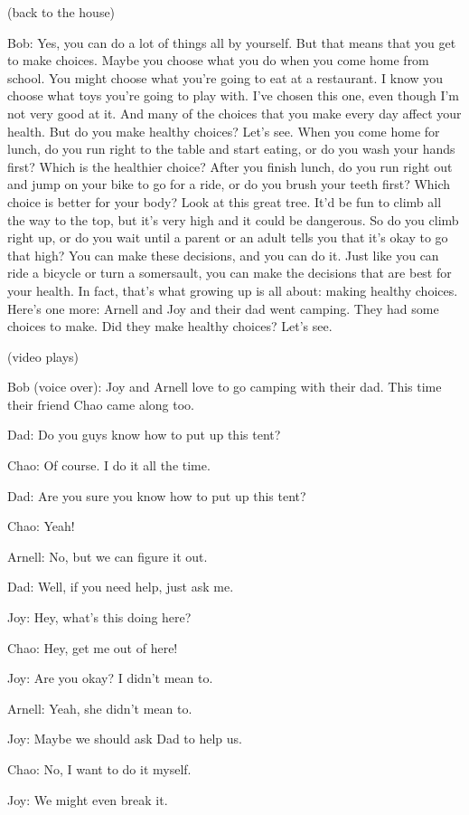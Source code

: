 (back to the house)

Bob: Yes, you can do a lot of things all by yourself. But that means that you get to make choices. Maybe you choose what you do when you come home from school. You might choose what you're going to eat at a restaurant. I know you choose what toys you're going to play with. I've chosen this one, even though I'm not very good at it. And many of the choices that you make every day affect your health. But do you make healthy choices? Let's see. When you come home for lunch, do you run right to the table and start eating, or do you wash your hands first? Which is the healthier choice? After you finish lunch, do you run right out and jump on your bike to go for a ride, or do you brush your teeth first? Which choice is better for your body? Look at this great tree. It'd be fun to climb all the way to the top, but it's very high and it could be dangerous. So do you climb right up, or do you wait until a parent or an adult tells you that it's okay to go that high? You can make these decisions, and you can do it. Just like you can ride a bicycle or turn a somersault, you can make the decisions that are best for your health. In fact, that's what growing up is all about: making healthy choices. Here's one more: Arnell and Joy and their dad went camping. They had some choices to make. Did they make healthy choices? Let's see.

(video plays)

Bob (voice over): Joy and Arnell love to go camping with their dad. This time their friend Chao came along too.

Dad: Do you guys know how to put up this tent?

Chao: Of course. I do it all the time.

Dad: Are you sure you know how to put up this tent?

Chao: Yeah!

Arnell: No, but we can figure it out.

Dad: Well, if you need help, just ask me.

Joy: Hey, what's this doing here?

Chao: Hey, get me out of here!

Joy: Are you okay? I didn't mean to.

Arnell: Yeah, she didn't mean to.

Joy: Maybe we should ask Dad to help us.

Chao: No, I want to do it myself.

Joy: We might even break it.

